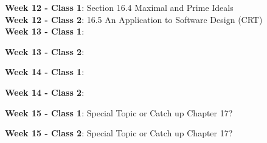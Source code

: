 \documentclass[10pt]{amsart}
\begin{document}
{\bf Week 12 - Class 1}:  Section 16.4 Maximal and Prime Ideals\\

{\bf Week 12 - Class 2}: 16.5 An Application to Software Design (CRT)\\

{\bf Week 13 - Class 1}: 

{\bf Week 13 - Class 2}: 

{\bf Week 14 - Class 1}: 

{\bf Week 14 - Class 2}:

{\bf Week 15 - Class 1}: Special Topic or Catch up
Chapter 17?

{\bf Week 15 - Class 2}: Special Topic or Catch up
Chapter 17?
\end{document}
